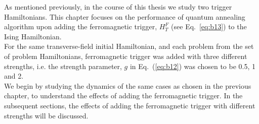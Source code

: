 \documentclass[../main.tex]{subfiles}
\begin{document}
As mentioned previously, in the course of this thesis we study two trigger Hamiltonians. This chapter focuses on the performance of quantum annealing algorithm upon adding the ferromagnetic trigger, $H_T^F$ (see Eq.~\ref{eq:b13}) to the Ising Hamiltonian. \\
For the same transverse-field initial Hamiltonian, and each problem from the set of problem Hamiltonians, ferromagnetic trigger was added with three different strengths, i.e. the strength parameter, $g$ in Eq.~(\ref{eq:b12}) was chosen to be 0.5, 1 and 2.\\
We begin by studying the dynamics of the same cases as chosen in the previous chapter, to understand the effects of adding the ferromagnetic trigger. In the subsequent sections, the effects of adding the ferromagnetic trigger with different strengths will be discussed. 
\end{document}

